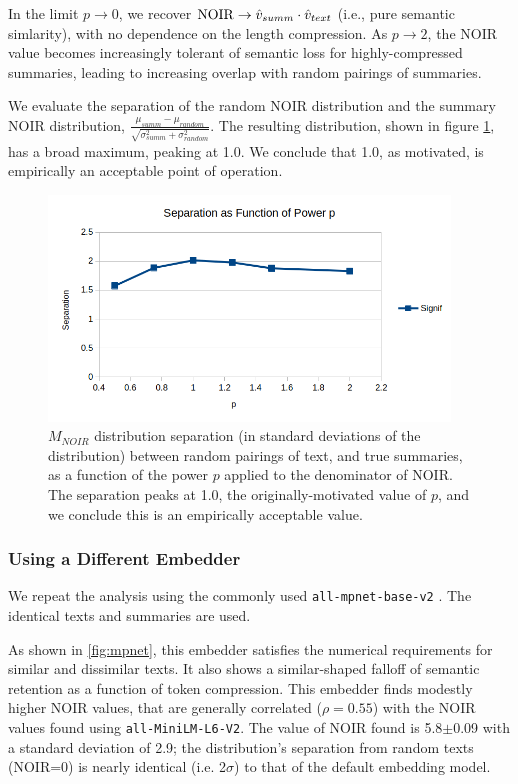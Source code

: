 \documentclass{article}
\begin{document}
{In the limit $p \rightarrow 0$, we recover ${\rm NOIR} \rightarrow \hat{v}_{summ} \cdot \hat{v}_{text}$ (i.e., pure semantic simlarity), with no dependence on the length compression.
As $p \rightarrow 2$, the NOIR value becomes increasingly tolerant of semantic loss for highly-compressed summaries, leading to increasing overlap with random pairings of summaries.

We evaluate the separation of the random NOIR distribution and the summary NOIR distribution, $\frac{\mu_{summ}-\mu_{random}}{\sqrt{\sigma_{summ}^2+\sigma_{random}^2}}$.
	The resulting distribution, shown in figure \ref{fig:powerseparation]}, has a broad maximum, peaking at 1.0.  We conclude that 1.0, as motivated, is empirically an acceptable point of operation.

\begin{figure}
	\centering
	\includegraphics[height=6cm]{powertest.png}
	\caption{$M_{NOIR}$ distribution separation (in standard deviations of the distribution) between random pairings of text, and true summaries, as a function of the power $p$ applied to the denominator of NOIR.  The separation peaks at 1.0, the originally-motivated value of $p$, and we conclude this is an empirically acceptable value.}
	\label{fig:powerseparation]}
\end{figure}

\subsubsection{Using a Different Embedder}

We repeat the analysis using the commonly 
used \texttt{all-mpnet-base-v2}  
\citep{mpnet}.
The identical texts and summaries are used.

As shown in \ref{fig:mpnet}, this embedder satisfies the numerical requirements for similar and dissimilar texts.
It also shows a similar-shaped falloff of semantic retention as a function of token compression.
This embedder finds modestly higher NOIR values, that are generally correlated ($\rho=0.55$) with the NOIR values found using \texttt{all-MiniLM-L6-V2}.
The value of NOIR found is 5.8$\pm$0.09 with a standard deviation of 2.9;
the distribution's separation from random texts (NOIR=0) is nearly identical (i.e. 2$\sigma$) to that of the default embedding model.

}
\end{document}
